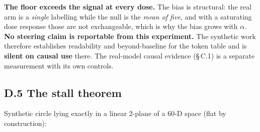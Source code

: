 \textbf{The floor exceeds the signal at every dose.} The bias is structural: the real arm is a \emph{single}
labelling while the null is the \emph{mean of five}, and with a saturating dose response those are not
exchangeable, which is why the bias grows with \(\alpha\). \textbf{No steering claim is reportable from this
experiment.} The synthetic work therefore establishes readability and beyond-baseline for the token
table and is \textbf{silent on causal use} there. The real-model causal evidence (\S\,C.1) is a separate
measurement with its own controls.

\hypertarget{d.5-the-stall-theorem}{%
\subsection{D.5 The stall theorem}\label{d.5-the-stall-theorem}}

Synthetic circle lying exactly in a linear 2-plane of a 60-D space (flat by construction):

